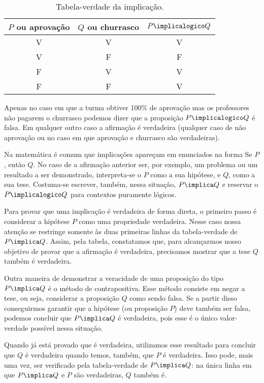 \begin{table}[h]
	\centering
	\begin{tabular}{cc|c}
		$P$ ou aprovação		& $Q$ ou churrasco 		& $P \implicalogico Q$ \\ \hline
		V		& V			& V			           \\
		V		& F			& F			           \\
		F		& V			& V			           \\
		F		& F			& V			           \\	
	\end{tabular}
	\caption{Tabela-verdade da implicação.}
	\label{tbl:implicacao}
\end{table}

Apenas no caso em que a turma obtiver 100\% de aprovação mas os professores não pagarem o churrasco podemos dizer que a proposição $P \implicalogico Q$ é falsa. Em qualquer outro caso a afirmação é verdadeira (qualquer caso de não aprovação ou no caso em que aprovação e churrasco são verdadeiras).


Na matemática é comum que implicações apareçam em enunciados na forma \abreaspas Se $P$, então $Q$\fechaaspas.
No caso de a afirmação anterior ser, por exemplo, um problema ou um resultado a ser demonstrado, interpreta-se o $P$ como a sua hipótese, e $Q$, como a sua tese. Costuma-se escrever, também, nessa situação, $P \implica Q$ e reservar o $P \implicalogico Q$ para contextos puramente lógicos.

Para provar que uma implicação é verdadeira de forma direta, o primeiro passo é considerar a hipótese $P$ como uma propriedade verdadeira. Nesse caso nossa atenção se restringe somente às duas primeiras linhas da tabela-verdade de $P \implica Q$.
Assim, pela tabela, constatamos que, para alcançarmos nosso objetivo de provar que a afirmação  é verdadeira, precisamos mostrar que a tese $Q$ também é verdadeira.

Outra maneira de demonstrar a veracidade de uma proposição do tipo $P \implica Q$ é o método de contrapositiva. Esse método consiste em negar a tese, ou seja, considerar a proposição $Q$ como sendo falsa. Se a partir disso conseguirmos garantir que a hipótese (ou proposição $P$) deve também ser falsa, podemos concluir que $P \implica Q$ é verdadeira, pois esse é o único valor-verdade possível nessa situação. 

Quando já está provado que  é verdadeira, utilizamos esse resultado para concluir que $Q$ é verdadeira quando temos, também, que $P$ é verdadeira. Isso pode, mais uma vez, ser verificado pela tabela-verdade de $P \implica Q$: na única linha em que $P \implica Q$ e $P$ são verdadeiras, $Q$ também é.

